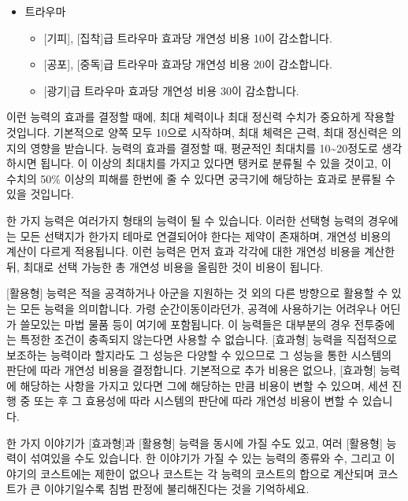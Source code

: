 \documentclass{report}
\begin{document}
\begin{itemize}
		\item 트라우마
		\begin{itemize}
			\item {}[기피], [집착]급 트라우마 효과당 개연성 비용 10이 감소합니다.
			\item {}[공포], [중독]급 트라우마 효과당 개연성 비용 20이 감소합니다.
			\item {}[광기]급 트라우마 효과당 개연성 비용 30이 감소합니다.
		\end{itemize}
	\end{itemize}
	
	이런 능력의 효과를 결정할 때에, 최대 체력이나 최대 정신력 수치가 중요하게 작용할 것입니다. 기본적으로 양쪽 모두 10으로 시작하며, 최대 체력은 근력, 최대 정신력은 의지의 영향을 받습니다. 능력의 효과를 결정할 때, 평균적인 최대치를 10\textasciitilde20정도로 생각하시면 됩니다. 이 이상의 최대치를 가지고 있다면 탱커로 분류될 수 있을 것이고, 이 수치의 50\% 이상의 피해를 한번에 줄 수 있다면 궁극기에 해당하는 효과로 분류될 수 있을 것입니다.
	
	한 가지 능력은 여러가지 형태의 능력이 될 수 있습니다. 이러한 선택형 능력의 경우에는 모든 선택지가 한가지 테마로 연결되어야 한다는 제약이 존재하며, 개연성 비용의 계산이 다르게 적용됩니다. 이런 능력은 먼저 효과 각각에 대한 개연성 비용을 계산한 뒤, 최대로 선택 가능한 총 개연성 비용을 올림한 것이 비용이 됩니다.
	
	[활용형] 능력은 적을 공격하거나 아군을 지원하는 것 외의 다른 방향으로 활용할 수 있는 모든 능력을 의미합니다. 가령 순간이동이라던가, 공격에 사용하기는 어려우나 어딘가 쓸모있는 마법 물품 등이 여기에 포함됩니다. 이 능력들은 대부분의 경우 전투중에는 특정한 조건이 충족되지 않는다면 사용할 수 없습니다. [효과형] 능력을 직접적으로 보조하는 능력이라 할지라도 그 성능은 다양할 수 있으므로 그 성능을 통한 시스템의 판단에 따라 개연성 비용을 결정합니다. 기본적으로 추가 비용은 없으나, [효과형] 능력에 해당하는 사항을 가지고 있다면 그에 해당하는 만큼 비용이 변할 수 있으며, 세션 진행 중 또는 후 그 효용성에 따라 시스템의 판단에 따라 개연성 비용이 변할 수 있습니다.
	
	한 가지 이야기가 [효과형]과 [활용형] 능력을 동시에 가질 수도 있고, 여러 [활용형] 능력이 섞여있을 수도 있습니다. 한 이야기가 가질 수 있는 능력의 종류와 수, 그리고 이야기의 코스트에는 제한이 없으나 코스트는 각 능력의 코스트의 합으로 계산되며 코스트가 큰 이야기일수록 침범 판정에 불리해진다는 것을 기억하세요.
	
	\bigskip
	
\end{document}
